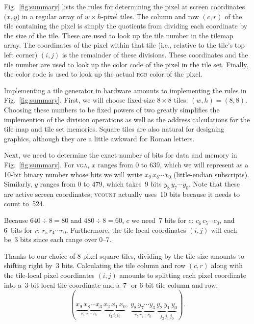 \documentclass[11pt]{article}
\newcommand{\figref}[1]{Fig.~\ref{fig:#1}}
\begin{document}
\figref{summary} lists the rules for determining the pixel at screen
coordinates $(x,y$) in a regular array of $w \times h$-pixel tiles.  The
column and row $(c,r)$ of the tile containing the pixel is simply the
quotients from dividing each coordinate by the size of the tile.
These are used to look up the tile number in the tilemap array.  The
coordinates of the pixel within that tile (i.e., relative to the
tile's top left corner) $(i,j)$ is the remainder of these divisions.
These coordinates and the tile number are used to look up the color
code of the pixel in the tile set.  Finally, the color code is used to
look up the actual \textsc{rgb} color of the pixel.

Implementing a tile generator in hardware amounts to implementing the
rules in \figref{summary}.  First, we will choose fixed-size
$8\times8$ tiles: $(w,h) = (8,8)$.  Choosing these numbers to be fixed
powers of two greatly simplifies the implemention of the division
operations as well as the address calculations for the tile map and
tile set memories.  Square tiles are also natural for designing
graphics, although they are a little awkward for Roman letters.

Next, we need to determine the exact number of bits for data and
memory in \figref{summary}.  For \textsc{vga}, $x$ ranges from $0$ to
$639$, which we will represent as a 10-bit binary number whose bits we
will write $x_9\,x_8\cdots x_0$ (little-endian subscripts).
Similarly, $y$ ranges from $0$ to $479$, which takes~9 bits
$y_8\,y_7\cdots y_0$.  Note that these are active screen coordinates;
\textsc{vcount} actually uses~10 bits because it needs to count to~524.

Because $640 \div 8 = 80$ and $480 \div 8 =
60$, $c$ we need~7 bits for $c$: $c_6\,c_5\cdots c_0$, and 6~bits for
$r$: $r_5\,r_4\cdots r_0$.  Furthermore, the tile local coordinates
$(i,j)$ will each be~3 bits since each range over 0--7.

Thanks to our choice of 8-pixel-square tiles, dividing by the tile
size amounts to shifting right by~3 bits.  Calculating the tile column
and row $(c,r)$ along with the tile-local pixel coordinates $(i,j)$
amounts to splitting each pixel coordinate into a~3-bit local tile
coordinate and a~7- or 6-bit tile column and row:
%
\begin{equation}
(\underbrace{x_9\,x_8\cdots x_3}_{c_6\,c_5\cdots c_0}\,
\underbrace{x_2\,x_1\,x_0}_{i_2\,i_1i_0}
,\ \underbrace{y_8\,y_7\cdots y_3}_{r_5\,r_4\cdots r_0}\,
\underbrace{y_2\,y_1\,y_0}_{j_2\,j_1\,j_0}).
\label{eq:column-row}
\end{equation}
\end{document}
